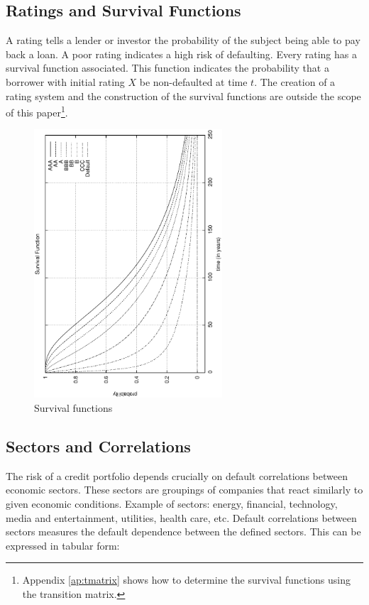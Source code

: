 \documentclass[a4paper,12pt,final]{article}
\begin{document}
\subsection{Ratings and Survival Functions}
A rating tells a lender or investor the probability of the subject being 
able to pay back a loan. A poor rating indicates a high risk of defaulting.
Every rating has a survival function associated. This function indicates the 
probability that a borrower with initial rating $X$ be non-defaulted at time $t$.
The creation of a rating system and the construction of the survival functions are 
outside the scope of this paper\footnote{Appendix \ref{ap:tmatrix} shows 
how to determine the survival functions using the transition matrix.}.

\begin{figure}[!hbt]
\begin{center}
\includegraphics[height=10cm, angle=-90]{./images/survival.ps}
\caption{Survival functions}
\label{survival}
\end{center}
\end{figure}
\FloatBarrier

\subsection{Sectors and Correlations}
\label{sectors}
The risk of a credit portfolio depends crucially on default correlations between 
economic sectors. These sectors are groupings of companies that react similarly to 
given economic conditions. Example of sectors: energy, financial, technology, 
media and entertainment, utilities, health care, etc. Default correlations between 
sectors measures the default dependence between the defined sectors. This can 
be expressed in tabular form:
\end{document}
